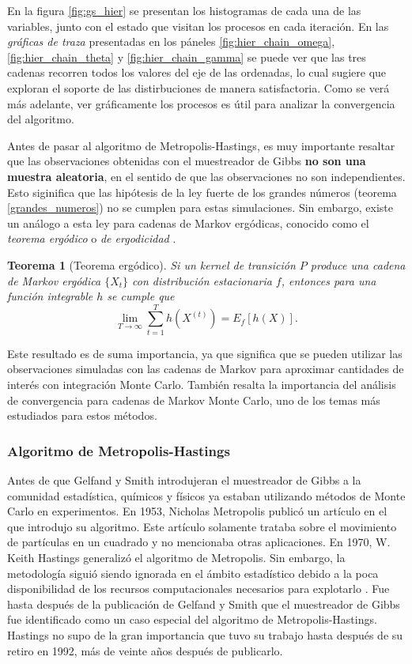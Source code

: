 \documentclass[11pt,a4paper]{article}
\newtheorem{theorem}{Teorema}[section]
\begin{document}
En la figura \ref{fig:gs_hier} se presentan los histogramas de cada una de las variables, junto con el estado que visitan los procesos en cada iteración. En las \textit{gráficas de traza} presentadas en los páneles \ref{fig:hier_chain_omega}, \ref{fig:hier_chain_theta} y \ref{fig:hier_chain_gamma} se puede ver que las tres cadenas recorren todos los valores del eje de las ordenadas, lo cual sugiere que exploran el soporte de las distirbuciones de manera satisfactoria. Como se verá más adelante, ver gráficamente los procesos es útil para analizar la convergencia del algoritmo.

Antes de pasar al algoritmo de Metropolis-Hastings, es muy importante resaltar que las observaciones obtenidas con el muestreador de Gibbs \textbf{no son una muestra aleatoria}, en el sentido de que las observaciones no son independientes. Esto siginifica que las hipótesis de la ley fuerte de los grandes números (teorema \ref{grandes_numeros}) no se cumplen para estas simulaciones. Sin embargo, existe un análogo a esta ley para cadenas de Markov ergódicas, conocido como el \textit{teorema ergódico} o \textit{de ergodicidad} \citep{casella}.

\begin{theorem}[Teorema ergódico]
Si un kernel de transición $P$ produce una cadena de Markov ergódica $\lbrace X_t \rbrace$ con distribución estacionaria $f$, entonces para una función integrable $h$ se cumple que
\begin{equation}
\lim_{T \to \infty} \sum_{t = 1}^T h(X^{(t)}) = E_f[h(X)].
\end{equation}
\end{theorem}


Este resultado es de suma importancia, ya que significa que se pueden utilizar las observaciones simuladas con las cadenas de Markov para aproximar cantidades de interés con integración Monte Carlo. También resalta la importancia del análisis de convergencia para cadenas de Markov Monte Carlo, uno de los temas más estudiados para estos métodos.

\subsubsection*{Algoritmo de Metropolis-Hastings}
\label{sec:mh}

Antes de que Gelfand y Smith introdujeran el muestreador de Gibbs a la comunidad estadística, químicos y físicos ya estaban utilizando métodos de Monte Carlo en experimentos. En 1953, Nicholas Metropolis publicó un artículo en el que introdujo su algoritmo. Este artículo solamente trataba sobre el movimiento de partículas en un cuadrado y no mencionaba otras aplicaciones. En 1970, W. Keith Hastings generalizó el algoritmo de Metropolis. Sin embargo, la metodología siguió siendo ignorada en el ámbito estadístico debido a la poca disponibilidad de los recursos computacionales necesarios para explotarlo \citep{bertsch}. Fue hasta después de la publicación de Gelfand y Smith que el muestreador de Gibbs fue identificado como un caso especial del algoritmo de Metropolis-Hastings. Hastings no supo de la gran importancia que tuvo su trabajo hasta después de su retiro en 1992, más de veinte años después de publicarlo.
\end{document}
